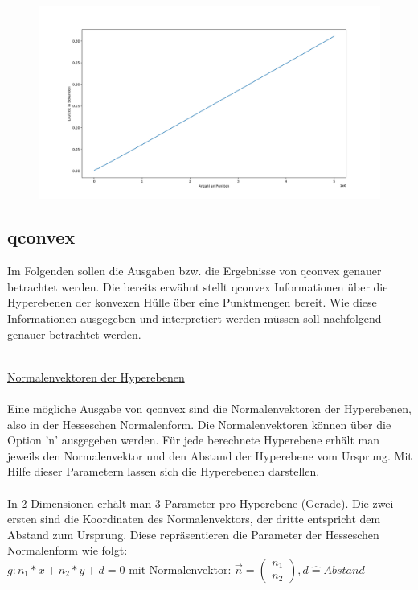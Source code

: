 \documentclass[12pt]{scrartcl}
\begin{document}
\begin{figure}[H]
    \centering
    \includegraphics[scale=0.32]{runtimes2.png}
\end{figure}



\subsection{qconvex}
Im Folgenden sollen die Ausgaben bzw. die Ergebnisse von qconvex genauer betrachtet werden. Die bereits erwähnt stellt qconvex Informationen über die Hyperebenen der konvexen Hülle über eine Punktmengen bereit. Wie diese Informationen ausgegeben und interpretiert werden müssen soll nachfolgend genauer betrachtet werden.

\ \\
\underline{Normalenvektoren der Hyperebenen}\\~\\
Eine mögliche Ausgabe von qconvex sind die Normalenvektoren der Hyperebenen, also in der Hesseschen Normalenform. Die Normalenvektoren können über die Option 'n' ausgegeben werden. Für jede berechnete Hyperebene erhält man jeweils den Normalenvektor und den Abstand der Hyperebene vom Ursprung. Mit Hilfe dieser Parametern lassen sich die Hyperebenen darstellen.\\~\\

In 2 Dimensionen erhält man 3 Parameter pro Hyperebene (Gerade). Die zwei ersten sind die Koordinaten des Normalenvektors, der dritte entspricht dem Abstand zum Ursprung. Diese repräsentieren die Parameter der Hesseschen Normalenform wie folgt:\\

$ g: n_1*x+n_2*y+d = 0 $ mit Normalenvektor: $\vec{n} = \begin{pmatrix}n_1 \\ n_2\end{pmatrix}, d \widehat{=} Abstand$
\end{document}
